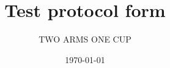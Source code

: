 \documentclass{article}
\begin{document}

\author{TWO ARMS ONE CUP} %
\date{\today}

\title{Test protocol form}

\begin{Form}

\maketitle



\newpage



\end{Form}
\end{document}
